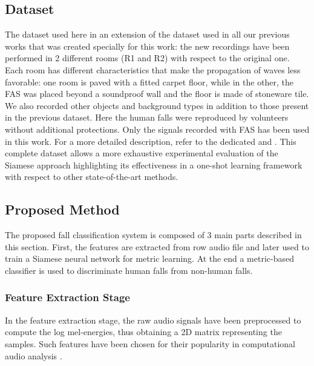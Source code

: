 \subsection{Dataset}
The dataset used here in an extension of the dataset used in all our previous works that was created specially for this work: the new recordings have been performed in 2 different rooms (R1 and R2) with respect to the original one. Each room has different characteristics that make the propagation of waves less favorable: one room is paved with a fitted carpet floor, while in the other, the FAS was placed beyond a soundproof wall and the floor is made of stoneware tile. We also recorded other objects and background types in addition to those present in the previous dataset. Here the human falls were reproduced by volunteers without additional protections. Only the signals recorded with FAS has been used in this work. For a more detailed description, refer to the dedicated  and .
This complete dataset allows a more exhaustive experimental evaluation of the Siamese approach highlighting its effectiveness in a one-shot learning framework with respect to other state-of-the-art methods.

\subsection{Proposed Method}
The proposed fall classification system is composed of 3 main parts described in this section.
First, the features are extracted from row audio file and later used to train a Siamese neural network for metric learning. At the end a metric-based classifier is used to discriminate human falls from non-human falls.

\subsubsection{Feature Extraction Stage}
In the feature extraction stage, the raw audio signals have been preprocessed to compute the log mel-energies, thus obtaining a 2D matrix representing the samples.
Such features have been chosen for their popularity in computational audio analysis \cite{gemmeke2013exemplar, mesaros2010acoustic, parascandolo2017convolutional}.

